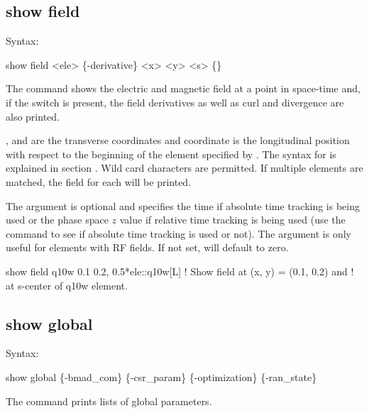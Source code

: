 {{{{{{{{%

\subsection{show field}
\label{s:show.field}

Syntax:
\begin{example}
  show field <ele> \{-derivative\} <x> <y> <s> \{<t-or-z>\}
\end{example}

The  command shows the electric and magnetic field at a point in space-time and, if
the  switch is present, the field derivatives as well as curl and divergence are
also printed.

, and  are the transverse coordinates and  coordinate is the longitudinal
position with respect to the beginning of the element specified by . The syntax for
 is explained in section . Wild card characters are permitted. If
multiple elements are matched, the field for each will be printed.

The  argument is optional and specifies the time if absolute time tracking is being
used or the phase space $z$ value if relative time tracking is being used (use the  command to see if absolute time tracking is used or not). The  argument is
only useful for elements with RF fields. If not set,  will default to zero.

\begin{example}
  show field q10w 0.1  0.2, 0.5*ele::q10w[L]    ! Show field at (x, y) = (0.1, 0.2) and 
                                                !    at s-center of q10w element.
\end{example}


\subsection{show global}
\label{s:show.global}

Syntax:
\begin{example}
  show global \{-bmad_com\} \{-csr_param\} \{-optimization\} \{-ran_state\} 
\end{example}

The  command prints lists of global parameters.  

}}}}}}}}
